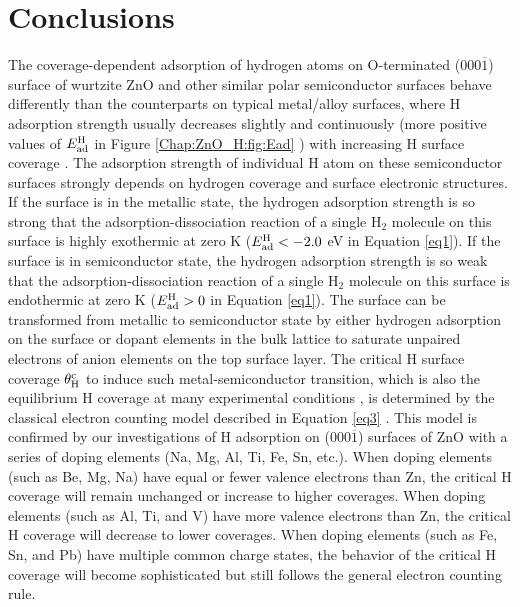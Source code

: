 \section{Conclusions}

The coverage-dependent adsorption of hydrogen atoms on O-terminated (000$\overline{1}$) surface of wurtzite ZnO and other similar polar semiconductor surfaces behave differently than the counterparts on typical metal/alloy surfaces, where H adsorption strength usually decreases slightly and continuously (more positive values of $E_{\textup{ad}}^{\textup{H}}$ in Figure \ref{Chap:ZnO_H:fig:Ead} ) with increasing H surface coverage \cite{pallassana1999theoretical,qi2012adsorbate}. The adsorption strength of individual H atom on these semiconductor surfaces strongly depends on hydrogen coverage and surface electronic structures. If the surface is in the metallic state, the hydrogen adsorption strength is so strong that the adsorption-dissociation reaction of a single H$_2$ molecule on this surface is highly exothermic at zero K ($E_{\textup{ad}}^{\textup{H}} < -2.0 $ eV in Equation \ref{eq1}). If the surface is in semiconductor state, the hydrogen adsorption strength is so weak that the adsorption-dissociation reaction of a single H$_2$ molecule on this surface is endothermic at zero K ($E_{\textup{ad}}^{\textup{H}} > 0 $ in Equation \ref{eq1}).  The surface can be transformed from metallic to semiconductor state by either hydrogen adsorption on the surface or dopant elements in the bulk lattice to saturate unpaired electrons of anion elements on the top surface layer. The critical H surface coverage $\theta_{\textup{H}}^{\textup{c}}$ to induce such metal-semiconductor transition, which is also the equilibrium H coverage at many experimental conditions \cite{lin2007density,meyer2004first,lauritsen2011stabilization},  is determined by the classical electron counting model described in Equation \ref{eq3} \cite{pashley1989electron}. This model is confirmed by our investigations of H adsorption on (000$\overline{1}$) surfaces of ZnO with a series of doping elements (Na, Mg, Al, Ti, Fe, Sn, etc.). When doping elements (such as Be, Mg, Na) have equal or fewer valence electrons than Zn, the critical H coverage will remain unchanged or increase to higher coverages. When doping elements (such as Al, Ti, and V) have more valence electrons than Zn, the critical H coverage will decrease to lower coverages. When doping elements (such as Fe, Sn, and Pb) have multiple common charge states, the behavior of the critical H coverage will become sophisticated but still follows the general electron counting rule.

